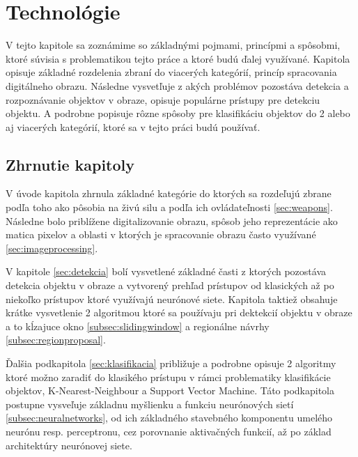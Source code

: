 \chapter{Technológie}   %
\label{chap:technologie}

V tejto kapitole sa zoznámime so základnými pojmami, princípmi a spôsobmi, ktoré súvisia s problematikou tejto práce a ktoré budú ďalej využívané.
Kapitola opisuje základné rozdelenia zbraní do viacerých kategórií, princíp spracovania digitálneho obrazu.
Následne vysvetľuje z akých problémov pozostáva detekcia a rozpoznávanie objektov v obraze, opisuje populárne prístupy pre detekciu objektu.
A podrobne popisuje rôzne spôsoby pre klasifikáciu objektov do 2 alebo aj viacerých kategórií, ktoré sa v tejto práci budú používať.













\section{Zhrnutie kapitoly}

V úvode kapitola zhrnula základné kategórie do ktorých sa rozdeľujú zbrane podľa toho ako pôsobia na živú silu a podľa ich ovládateľnosti \ref{sec:weapons}.
Následne bolo priblížene digitalizovanie obrazu, spôsob jeho reprezentácie ako matica pixelov a oblasti v ktorých je spracovanie obrazu často využívané \ref{sec:imageprocessing}.

V kapitole \ref{sec:detekcia} bolí vysvetlené základné časti z ktorých pozostáva detekcia objektu v obraze a vytvorený prehľad prístupov od
    klasických až po niekoľko prístupov ktoré využívajú neurónové siete.
Kapitola taktiež obsahuje krátke vysvetlenie 2 algoritmou ktoré sa používaju pri dektekcií objektu v obraze a to kĺzajuce okno \ref{subsec:slidingwindow} a
    regionálne návrhy \ref{subsec:regionproposal}.

Ďalšia podkapitola \ref{sec:klasifikacia} približuje a podrobne opisuje 2 algoritmy ktoré možno zaradiť do klasikého prístupu v rámci problematiky klasifikácie objektov,
    K-Nearest-Neighbour a Support Vector Machine.
Táto podkapitola postupne vysveľuje základnu myšlienku a funkciu neurónových sietí \ref{subsec:neuralnetworks}, od ich základného stavebného komponentu umelého neurónu resp. perceptronu,
    cez porovnanie aktivačných funkcií, až po základ architektúry neurónovej siete.

